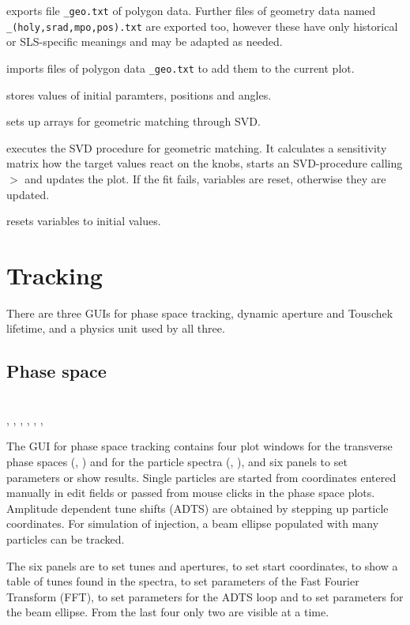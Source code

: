 \documentclass[12pt]{article}
\newcommand\code[1]{{\tt #1}}
\newcommand\guico[1]{{\color{blue}\code{#1}}}
\newcommand{\unico}[1]{{\color{burntorange}\code{#1}}}
\newcommand{\prcod}[2]{\opauni{#1}$>$\unico{#2}}
\newcommand{\opagui}[1]{\colorbox{blue!20}{{\color{black}\code{#1}}}}
\newcommand{\oguih}[2]{\subsection{\label{#2}#1}{\Huge\opagui{#2}}\\}
\newcommand{\ogui}[1]{\hyperref[#1]{\opagui{#1}}}
\newcommand{\opaguif}[1]{\colorbox{violet!30}{{\color{black}\code{#1}}}}
\newcommand{\oguif}[1]{\hyperref[#1]{\opaguif{#1}}}
\newcommand{\opauni}[1]{\colorbox{orange!30}{{\color{black}\code{#1}}}}
\newcommand{\ouni}[1]{\hyperref[#1]{\opauni{#1}}}
\newcommand{\uses}[1]{\flushleft {\bf Uses:} #1}
\newcommand{\desc}[1]{#1}
\newcommand{\todo}[1]{{\color{red} #1}}
\begin{document}
\unico{WriteGeoFiles} exports file \code{*\_geo.txt} of polygon data. \todo{Further files of geometry data named \code{*\_(holy,srad,mpo,pos).txt} are exported too, however these have only historical or SLS-specific meanings and may be adapted as needed.}

\unico{ReadGeoFiles} imports files of polygon data \code{*\_geo.txt} to add them to the current plot. 

\unico{gsetedgval} stores values of initial paramters, positions and angles.

\unico{gmat\_ini} sets up arrays for geometric matching through SVD.

\unico{gmat\_step} executes the SVD procedure for geometric matching. It calculates a sensitivity matrix how the target values react on the knobs, starts an SVD-procedure calling \prcod{mathlib}{svdcmp,svbksb} and updates the plot. 
If the fit fails, variables are reset, otherwise they are updated. 

\unico{gmat\_reset} resets variables to initial values.


\section{\label{sectrac}Tracking}
There are three GUIs for phase space tracking, dynamic aperture and Touschek lifetime, and a physics unit used by all three. 

\oguih{Phase space}{opatrackps} 
\uses{\ouni{tracklib}, \ouni{globlib}, \ogui{opatunediag}, \ouni{mathlib}, \oguif{comfigureframe}, \ouni{comvgraphlib}, \ouni{comauxlib}}

\desc{
The GUI for phase space tracking contains four plot windows for the transverse phase spaces (\guico{psx}, \guico{psy}) and for the particle spectra (\guico{ftx}, \guico{fty}), and six panels to set parameters or show results. Single particles are started from coordinates entered manually in edit fields or passed from mouse clicks in the phase space plots.  Amplitude dependent tune shifts (ADTS) are obtained by stepping up particle coordinates. For simulation of injection, a beam ellipse populated with many particles can be tracked. 

The six panels are \guico{PanParam} to set tunes and apertures, \guico{PanCtrl} to set start coordinates, \guico{PanRes} to show a table of tunes found in the spectra, \guico{PanFFT} to set parameters of the Fast Fourier Transform (FFT), \guico{PanTush} to set parameters for the ADTS loop and \guico{PanBeam} to set parameters for the beam ellipse. From the last four only two are visible at a time.}
\end{document}
